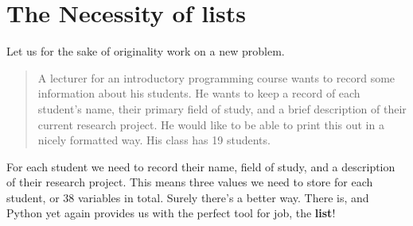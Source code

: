 \section{The Necessity of lists}

Let us for the sake of originality work on a new problem.
\begin{quotation}     A lecturer for an introductory programming course wants to record    some information about his students. He wants to keep a record of    each student's name, their primary field of study, and a brief    description of their current research project. He would like to be    able to print this out in a nicely formatted way. His class has 19    students.    
\end{quotation}

For each student we need to record their name, field of study, and a   description of their research project. This means three values we need   to store for each student, or 38 variables in total. Surely there's a   better way. There is, and Python yet again provides us with the perfect   tool for job, the \textbf{list}!

